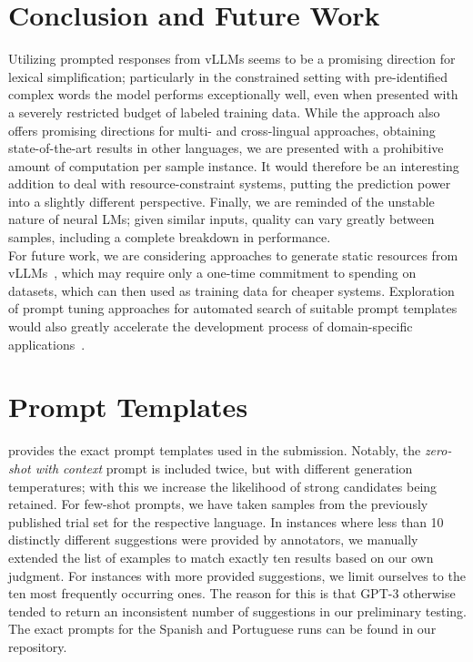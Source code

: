\documentclass[11pt]{article}
\newcommand{\todo}[1]{\textcolor{red}{TODO: #1}}
\begin{document}
\section{Conclusion and Future Work}
Utilizing prompted responses from vLLMs seems to be a promising direction for lexical simplification; particularly in the constrained setting with pre-identified complex words the model performs exceptionally well, even when presented with a severely restricted budget of labeled training data.
While the approach also offers promising directions for multi- and cross-lingual approaches, obtaining state-of-the-art results in other languages, we are presented with a prohibitive amount of computation per sample instance.
It would therefore be an interesting addition to deal with resource-constraint systems, putting the prediction power into a slightly different perspective.
Finally, we are reminded of the unstable nature of neural LMs; given similar inputs, quality can vary greatly between samples, including a complete breakdown in performance.\\
For future work, we are considering approaches to generate static resources from vLLMs~\cite{schick-schutze-2021-generating}, which may require only a one-time commitment to spending on datasets, which can then used as training data for cheaper systems.
Exploration of prompt tuning approaches for automated search of suitable prompt templates would also greatly accelerate the development process of domain-specific applications~\cite{lester-etal-2021-power}.





\appendix
\newpage

\section{Prompt Templates}
\label{sec:prompts}

 provides the exact prompt templates used in the submission. Notably, the \emph{zero-shot with context} prompt is included twice, but with different generation temperatures; with this we increase the likelihood of strong candidates being retained.
For few-shot prompts, we have taken samples from the previously published trial set for the respective language. In instances where less than 10 distinctly different suggestions were provided by annotators, we manually extended the list of examples to match exactly ten results based on our own judgment. For instances with more provided suggestions, we limit ourselves to the ten most frequently occurring ones. The reason for this is that GPT-3 otherwise tended to return an inconsistent number of suggestions in our preliminary testing. The exact prompts for the Spanish and Portuguese runs can be found in our repository.
\end{document}
